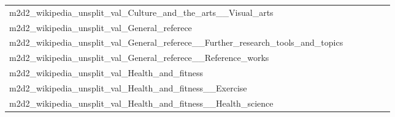 \documentclass[dvipsnames]{article}
\begin{document}
\begin{appendix}
{\begin{longtable}{m{6cm}m{1.7cm}m{1.7cm}m{1.7cm}m{1.7cm}m{1.7cm}}
	m2d2\_wikipedia\_unsplit\_val\_Culture\_and\_the\_arts\_\_Visual\_arts  & \colorbox[HTML]{fcfed9}{\makebox[\mywidth][c]{12.36}} & \colorbox[HTML]{eaf7af}{\makebox[\mywidth][c]{12.09}} & \colorbox[HTML]{ffffe5}{\makebox[\mywidth][c]{13.05}} & \colorbox[HTML]{c9e99b}{\makebox[\mywidth][c]{11.99}} & \colorbox[HTML]{77c578}{\makebox[\mywidth][c]{11.87}}\\
	m2d2\_wikipedia\_unsplit\_val\_General\_referece  & \colorbox[HTML]{fdfedb}{\makebox[\mywidth][c]{11.80}} & \colorbox[HTML]{ddf1a6}{\makebox[\mywidth][c]{11.46}} & \colorbox[HTML]{ffffe5}{\makebox[\mywidth][c]{12.43}} & \colorbox[HTML]{dcf1a5}{\makebox[\mywidth][c]{11.46}} & \colorbox[HTML]{77c578}{\makebox[\mywidth][c]{11.30}}\\
	m2d2\_wikipedia\_unsplit\_val\_General\_referece\_\_Further\_research\_tools\_and\_topics  & \colorbox[HTML]{fefee2}{\makebox[\mywidth][c]{10.52}} & \colorbox[HTML]{f3fab6}{\makebox[\mywidth][c]{10.20}} & \colorbox[HTML]{ffffe5}{\makebox[\mywidth][c]{10.96}} & \colorbox[HTML]{d9f0a3}{\makebox[\mywidth][c]{10.12}} & \colorbox[HTML]{77c578}{\makebox[\mywidth][c]{9.99}}\\
	m2d2\_wikipedia\_unsplit\_val\_General\_referece\_\_Reference\_works  & \colorbox[HTML]{fdfedb}{\makebox[\mywidth][c]{11.80}} & \colorbox[HTML]{ddf1a6}{\makebox[\mywidth][c]{11.46}} & \colorbox[HTML]{ffffe5}{\makebox[\mywidth][c]{12.43}} & \colorbox[HTML]{dcf1a5}{\makebox[\mywidth][c]{11.46}} & \colorbox[HTML]{77c578}{\makebox[\mywidth][c]{11.30}}\\
	m2d2\_wikipedia\_unsplit\_val\_Health\_and\_fitness  & \colorbox[HTML]{fefee2}{\makebox[\mywidth][c]{10.75}} & \colorbox[HTML]{edf8b2}{\makebox[\mywidth][c]{10.47}} & \colorbox[HTML]{ffffe5}{\makebox[\mywidth][c]{11.14}} & \colorbox[HTML]{bde395}{\makebox[\mywidth][c]{10.37}} & \colorbox[HTML]{77c578}{\makebox[\mywidth][c]{10.30}}\\
	m2d2\_wikipedia\_unsplit\_val\_Health\_and\_fitness\_\_Exercise  & \colorbox[HTML]{fefee3}{\makebox[\mywidth][c]{9.64}} & \colorbox[HTML]{e5f5ac}{\makebox[\mywidth][c]{9.29}} & \colorbox[HTML]{ffffe5}{\makebox[\mywidth][c]{9.95}} & \colorbox[HTML]{ddf1a6}{\makebox[\mywidth][c]{9.27}} & \colorbox[HTML]{77c578}{\makebox[\mywidth][c]{9.16}}\\
	m2d2\_wikipedia\_unsplit\_val\_Health\_and\_fitness\_\_Health\_science  & \colorbox[HTML]{ffffe5}{\makebox[\mywidth][c]{10.10}} & \colorbox[HTML]{f8fcc2}{\makebox[\mywidth][c]{9.80}} & \colorbox[HTML]{ffffe5}{\makebox[\mywidth][c]{10.43}} & \colorbox[HTML]{e6f5ad}{\makebox[\mywidth][c]{9.71}} & \colorbox[HTML]{77c578}{\makebox[\mywidth][c]{9.56}}\\

\end{longtable}}
\end{appendix}
\end{document}
